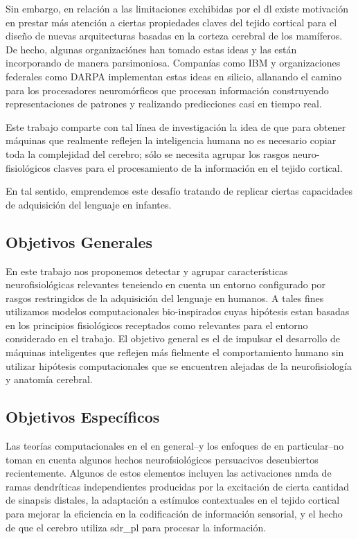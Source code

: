 Sin embargo, en relación a las limitaciones exchibidas por el \gls{dl} existe motivación en prestar más atención
a ciertas propiedades claves del tejido cortical para el diseño de nuevas arquitecturas
basadas en la corteza cerebral de los mamíferos.
De hecho, algunas organizaciónes han tomado estas ideas y las están incorporando de manera parsimoniosa.
Companías como IBM y organizaciones federales como DARPA implementan estas ideas en silicio,
allanando el camino para los procesadores neuromórficos que procesan información 
construyendo representaciones de patrones y realizando predicciones casi en tiempo real.




Este trabajo comparte con tal línea de investigación la idea de que para
obtener máquinas que realmente reflejen la inteligencia humana no es necesario
copiar toda la complejidad del cerebro; sólo se necesita agrupar
los rasgos neuro-fisiológicos clasves para el procesamiento de la información en el tejido cortical.




En tal sentido, emprendemos este desafío tratando de replicar ciertas capacidades de adquisición del lenguaje en infantes.





\subsection{Objetivos Generales}

En este trabajo nos proponemos detectar y agrupar características neurofisiológicas relevantes teneiendo en cuenta un entorno configurado por rasgos restringidos de la adquisición del lenguaje en humanos.
A tales fines utilizamos modelos computacionales bio-inspirados cuyas hipótesis estan basadas en los principios fisiológicos receptados como relevantes para el entorno considerado en el trabajo.
El objetivo general es el de impulsar el desarrollo de máquinas inteligentes que reflejen más fielmente el comportamiento humano sin utilizar hipótesis computacionales que se encuentren alejadas de la neurofisiología y anatomía cerebral.





\subsection{Objetivos Específicos}

Las teorías computacionales en el  en general--y los enfoques de  en particular--no toman en cuenta algunos hechos neurofsiológicos persuacivos descubiertos recientemente.
Algunos de estos elementos incluyen las activaciones \gls{nmda} de ramas dendríticas independientes producidas por la excitación de cierta cantidad de sinapsis distales, la adaptación a estímulos contextuales en el tejido cortical para mejorar la eficiencia en la codificación de información sensorial, y el hecho de que el cerebro utiliza \gls{sdr_pl} para procesar la información.

